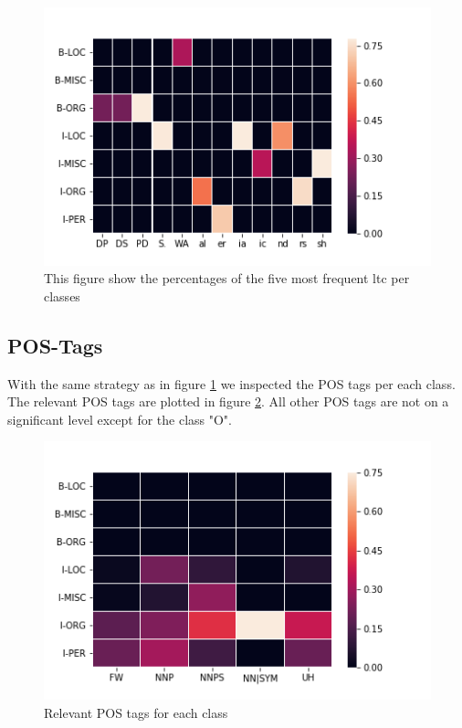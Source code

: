 \documentclass[noindent, nochapname]{tudexercise}
\begin{document}
			\begin{figure}[h]
				\centering
				\includegraphics[scale=0.6]{img/ltc_all_classes.png}
				\caption{This figure show the percentages of the five most frequent ltc per classes}
				\label{fig:ltc_for_all_classes}
			\end{figure}
		
		\subsection{POS-Tags}
			With the same strategy as in figure \ref{fig:ltc_for_all_classes} we inspected the POS tags per each class. The relevant POS tags are plotted in figure \ref{fig:pos_per_class}. All other POS tags are not on a significant level except for the class "O".
			
			\begin{figure}[h]
				\centering
				\includegraphics[scale=0.6]{img/pos_per_class.png}
				\caption{Relevant POS tags for each class}
				\label{fig:pos_per_class}
			\end{figure}
		
\end{document}
